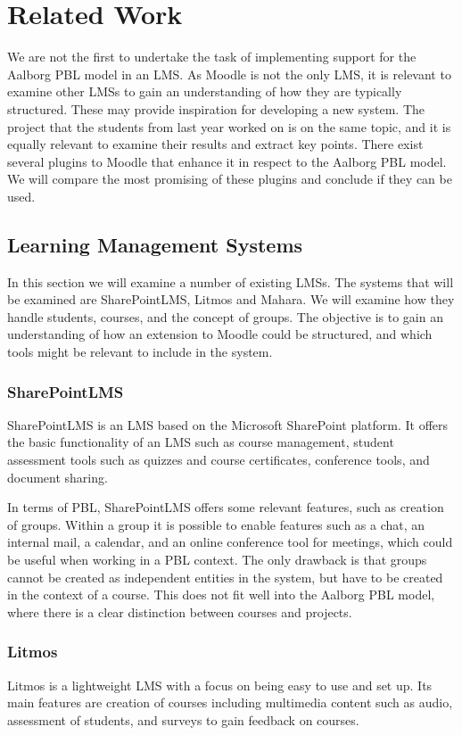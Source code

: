 \chapter{Related Work}
\label{chap:relatedwork}
We are not the first to undertake the task of implementing support for the Aalborg PBL model in an LMS. 
As Moodle is not the only LMS, it is relevant to examine other LMSs to gain an understanding of how they are typically structured. 
These may provide inspiration for developing a new system.
The project that the students from last year worked on is on the same topic, and it is equally relevant to examine their results and extract key points.
There exist several plugins to Moodle that enhance it in respect to the Aalborg PBL model.
We will compare the most promising of these plugins and conclude if they can be used.

\section{Learning Management Systems}\label{sec:LMS}
In this section we will examine a number of existing LMSs.
The systems that will be examined are SharePointLMS, Litmos and Mahara.
We will examine how they handle students, courses, and the concept of groups.
The objective is to gain an understanding of how an extension to Moodle could be structured, and which tools might be relevant to include in the system.

\subsection{SharePointLMS}
SharePointLMS \citep{sharepointlms} is an LMS based on the Microsoft SharePoint platform. 
It offers the basic functionality of an LMS such as course management, student assessment tools such as quizzes and course certificates, conference tools, and document sharing.

In terms of PBL, SharePointLMS offers some relevant features, such as creation of groups.
Within a group it is possible to enable features such as a chat, an internal mail, a calendar, and an online conference tool for meetings, which could be useful when working in a PBL context.
The only drawback is that groups cannot be created as independent entities in the system, but have to be created in the context of a course.
This does not fit well into the Aalborg PBL model, where there is a clear distinction between courses and projects.

\subsection{Litmos}
Litmos \citep{litmos} is a lightweight LMS with a focus on being easy to use and set up.
Its main features are creation of courses including multimedia content such as audio, assessment of students, and surveys to gain feedback on courses.

